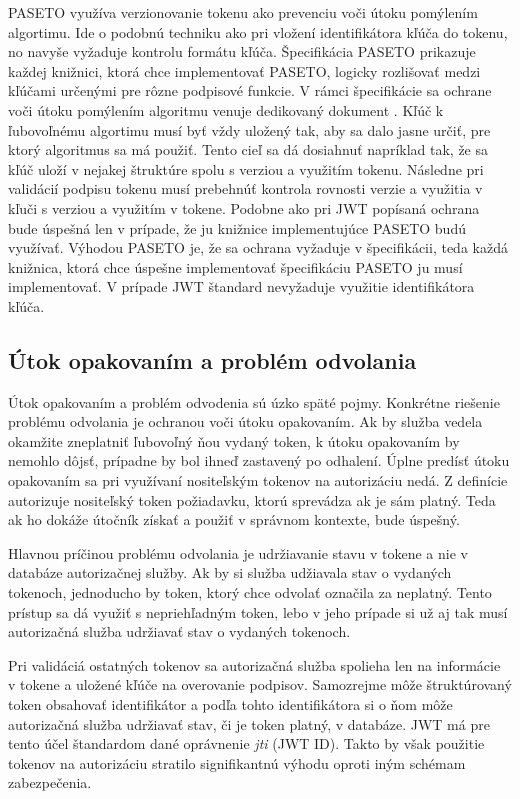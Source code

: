 PASETO využíva verzionovanie tokenu ako prevenciu voči útoku pomýlením algortimu. Ide o podobnú techniku ako pri vložení identifikátora kľúča do tokenu, no navyše vyžaduje kontrolu formátu kľúča. Špecifikácia PASETO \cite{paseto_git} prikazuje každej knižnici, ktorá chce implementovať PASETO, logicky rozlišovať medzi kľúčami určenými pre rôzne podpisové funkcie. V rámci špecifikácie sa ochrane voči útoku pomýlením algoritmu venuje dedikovaný dokument \cite{alg_lucidity}. Kľúč k ľubovoľnému algortimu musí byť vždy uložený tak, aby sa dalo jasne určiť, pre ktorý algoritmus sa má použiť. Tento cieľ sa dá dosiahnuť napríklad tak, že sa kľúč uloží v nejakej štruktúre spolu s verziou a využitím tokenu. Následne pri validácií podpisu tokenu musí prebehnúť kontrola rovnosti verzie a využitia v kľuči s verziou a využitím v tokene. Podobne ako pri JWT popísaná ochrana bude úspešná len v prípade, že ju knižnice implementujúce PASETO budú využívať. Výhodou PASETO je, že sa ochrana vyžaduje v špecifikácii, teda každá knižnica, ktorá chce úspešne implementovať špecifikáciu PASETO ju musí implementovať. V prípade JWT štandard \cite{jwt_rfc} nevyžaduje využitie identifikátora kľúča.

\subsection{Útok opakovaním a problém odvolania}

\label{sec:replay} %

Útok opakovaním a problém odvodenia sú úzko späté pojmy. Konkrétne riešenie problému odvolania je ochranou voči útoku opakovaním. Ak by služba vedela okamžite zneplatniť ľubovoľný ňou vydaný token, k útoku opakovaním by nemohlo dôjsť, prípadne by bol ihneď zastavený po odhalení. Úplne predísť útoku opakovaním sa pri využívaní nositeľským tokenov na autorizáciu nedá. Z definície autorizuje nositeľský token požiadavku, ktorú sprevádza ak je sám platný. Teda ak ho dokáže útočník získať a použiť v správnom kontexte, bude úspešný.

Hlavnou príčinou problému odvolania je udržiavanie stavu v tokene a nie v databáze autorizačnej služby. Ak by si služba udžiavala stav o vydaných tokenoch, jednoducho by token, ktorý chce odvolať označila za neplatný. Tento prístup sa dá využiť s nepriehľadným token, lebo v jeho prípade si už aj tak musí autorizačná služba udržiavať stav o vydaných tokenoch.

Pri validáciá ostatných tokenov sa autorizačná služba spolieha len na informácie v tokene a uložené kľúče na overovanie podpisov. Samozrejme môže štruktúrovaný token obsahovať identifikátor a podľa tohto identifikátora si o ňom môže autorizačná služba udržiavať stav, či je token platný, v databáze. JWT má pre tento účel štandardom dané oprávnenie \textit{jti} (JWT ID). Takto by však použitie tokenov na autorizáciu stratilo signifikantnú výhodu oproti iným schémam zabezpečenia.

